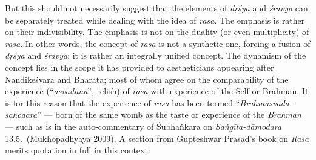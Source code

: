 But this should not necessarily suggest that the elements of \textsl{dṛśya} and \textsl{śravya} can be separately treated while dealing with the idea of \textsl{rasa}. The emphasis is rather on their indivisibility. The emphasis is not on the duality (or even multiplicity) of \textsl{rasa}. In other words, the concept of \textsl{rasa} is not a synthetic one, forcing a fusion of \textsl{dṛśya} and \textsl{śravya}; it is rather an integrally unified concept. The dynamism of the concept lies in the scope it has provided to aestheticians appearing after Nandikeśvara and Bharata; most of whom agree on the comparability of the experience (``\textsl{āsvādana}'', relish) of \textsl{rasa} with experience of the Self or Brahman. It is for this reason that the experience of \textsl{rasa} has been termed “\textsl{Brahmāsvāda-sahodara}” --- born of the same womb as the taste or experience of the \textsl{Brahman} --- such as is in the auto-commentary of Śubhaṅkara on \textsl{Saṅgīta-dāmodara} 13.5.~(Mukhopadhyaya 2009). A section from Gupteshwar Prasad’s book on \textsl{Rasa} merits quotation in full in this context:

